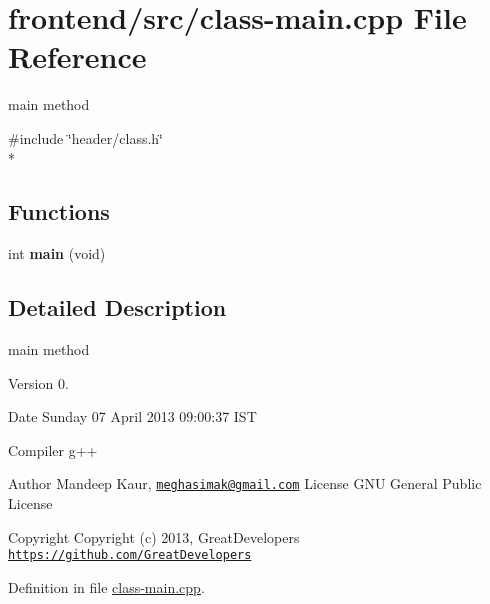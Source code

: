 \hypertarget{class-main_8cpp}{\section{frontend/src/class-\/main.cpp File Reference}
\label{class-main_8cpp}
}


main method  


{\ttfamily \#include \char`\"{}header/class.\-h\char`\"{}}\\*
\subsection*{Functions}
\begin{DoxyCompactItemize}
\item 
\hypertarget{class-main_8cpp_a840291bc02cba5474a4cb46a9b9566fe}{int {\bfseries main} (void)}\label{class-main_8cpp_a840291bc02cba5474a4cb46a9b9566fe}

\end{DoxyCompactItemize}


\subsection{Detailed Description}
main method \begin{DoxyVersion}{Version}
0. 
\end{DoxyVersion}
\begin{DoxyDate}{Date}
Sunday 07 April 2013 09\-:00\-:37 I\-S\-T\par
Compiler g++
\end{DoxyDate}
\begin{DoxyAuthor}{Author}
Mandeep Kaur, \href{mailto:meghasimak@gmail.com}{\tt meghasimak@gmail.\-com} License G\-N\-U General Public License 
\end{DoxyAuthor}
\begin{DoxyCopyright}{Copyright}
Copyright (c) 2013, Great\-Developers \href{https://github.com/GreatDevelopers}{\tt https\-://github.\-com/\-Great\-Developers} 
\end{DoxyCopyright}


Definition in file \hyperlink{class-main_8cpp_source}{class-\/main.\-cpp}.

